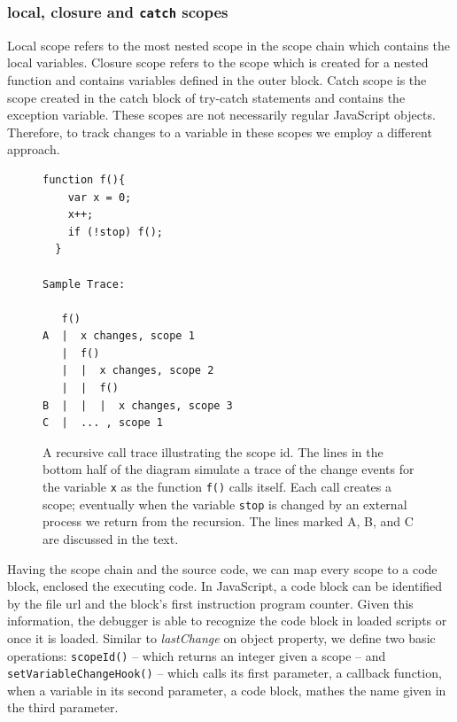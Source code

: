 \documentclass{sig-alternate}
\begin{document}
\subsubsection{local, closure and \texttt{catch} scopes}
Local scope refers to the most nested scope in the scope
chain which contains the local variables. Closure scope refers to the 
scope which is created for a nested function and contains variables 
defined in the outer block. Catch scope is the scope created in the catch
block of try-catch statements and contains the exception
variable. These scopes are not necessarily regular JavaScript
objects.  
Therefore, to track changes to a variable in these scopes we
employ a different approach.


\begin{figure}[htp]
\lstset{basicstyle=\scriptsize}
\begin{lstlisting}[language=myLang, framerule=0pt]
  function f(){
    var x = 0;
    x++;
    if (!stop) f();
  }

Sample Trace:

   f()
A  |  x changes, scope 1 
   |  f()
   |  |  x changes, scope 2
   |  |  f()
B  |  |  |  x changes, scope 3 
C  |  ... , scope 1
\end{lstlisting}
\caption{A recursive call trace illustrating the scope
  id. The lines in the bottom half of the diagram simulate a trace of the change events for the variable \texttt{x} as the function \texttt{f()} calls itself. Each call creates a scope; eventually when the variable \texttt{stop} is changed by an external process we return from the recursion. The lines marked A, B, and C are discussed in the text.}
\label{fig:recursive}
\end{figure}

Having the scope chain and the source code, we can map every scope to %
a code block, enclosed the executing code. In
JavaScript, a code block can be identified by the file url and  
the block's first instruction program counter. Given this information, the debugger is
able to recognize the code block in loaded scripts or once it is loaded.
Similar to \textit{lastChange} on object property, we define two basic operations: 
\texttt{scopeId()} -- which returns an integer given a scope -- and \texttt{setVariableChangeHook()} -- which calls its first parameter, a callback function, when a 
variable in its second parameter, a code block, mathes the name given in the third parameter.
\end{document}
